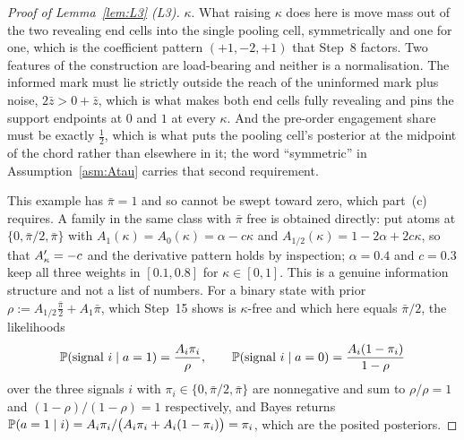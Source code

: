 \begin{proof}[Proof of Lemma~\ref{lem:L3} (L3)]
$\kappa$. What raising $\kappa$ does here is move mass out of the two revealing end cells into the
single pooling cell, symmetrically and one for one, which is the coefficient pattern $(+1,-2,+1)$
that Step~8 factors. Two features of the construction are load-bearing and neither is a
normalisation. The informed mark must lie strictly outside the reach of the uninformed mark plus
noise, $2\bar z > 0+\bar z$, which is what makes both end cells fully revealing and pins the support
endpoints at $0$ and $1$ at every $\kappa$. And the pre-order engagement share must be exactly
$\tfrac12$, which is what puts the pooling cell's posterior at the midpoint of the chord rather than
elsewhere in it; the word ``symmetric'' in Assumption~\ref{asm:Atau} carries that second requirement.

This example has $\bar\pi = 1$ and so cannot be swept toward zero, which part~(c) requires. A family
in the same class with $\bar\pi$ free is obtained directly: put atoms at $\{0,\bar\pi/2,\bar\pi\}$
with $A_1(\kappa) = A_0(\kappa) = \alpha-c\kappa$ and $A_{1/2}(\kappa) = 1-2\alpha+2c\kappa$, so that
$A'_{\kappa} = -c$ and the derivative pattern holds by inspection; $\alpha = 0.4$ and $c = 0.3$ keep all
three weights in $[0.1,0.8]$ for $\kappa \in [0,1]$. This is a genuine information structure and not
a list of numbers. For a binary state with prior
$\rho := A_{1/2}\tfrac{\bar\pi}{2}+A_1\bar\pi$, which Step~15 shows is $\kappa$-free and which here
equals $\bar\pi/2$, the likelihoods
\begin{equation}
\label{eq:L3-likelihood}
\mathbb{P}(\text{signal } i \mid a=1) = \frac{A_i\pi_i}{\rho},
\qquad
\mathbb{P}(\text{signal } i \mid a=0) = \frac{A_i(1-\pi_i)}{1-\rho}
\end{equation}
over the three signals $i$ with $\pi_i \in \{0,\bar\pi/2,\bar\pi\}$ are nonnegative and sum to
$\rho/\rho = 1$ and $(1-\rho)/(1-\rho) = 1$ respectively, and Bayes returns
$\mathbb{P}(a=1 \mid i) = A_i\pi_i/\bigl(A_i\pi_i+A_i(1-\pi_i)\bigr) = \pi_i$, which are the posited
posteriors.


\end{proof}
